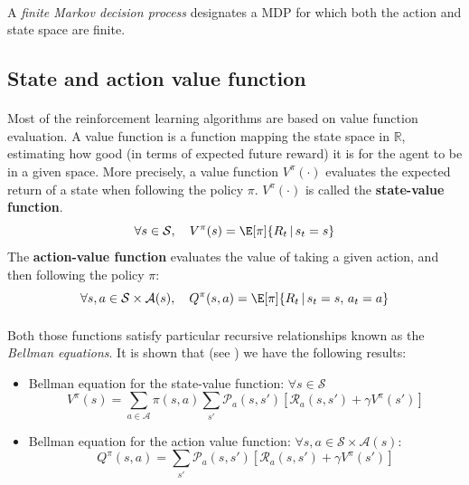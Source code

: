 \documentclass[a4paper]{report}
\begin{document}
{{{				\paragraph{} A \emph{finite Markov decision process} designates a MDP for which both the action and state space are finite. 
			}
			\subsection{State and action value function}
			{
				\paragraph{} Most of the reinforcement learning algorithms are based on value function evaluation. A value function is a function mapping the state space in $\mathbb{R}$, estimating how good (in terms of expected future reward) it is for the agent to be in a given space. More precisely, a value function $V^\pi(\cdot)$ evaluates the expected return of a state when following the policy $\pi$. $V^\pi(\cdot)$ is called the \textbf{state-value function}. 
				\begin{equation}
					\forall{s}\in\mathcal{S}, \quad V^\pi(s) = \E[\pi]{R_t \, \vert \, s_t = s}
				\end{equation}
				The \textbf{action-value function} evaluates the value of taking a given action, and then following the policy $\pi$: 
				\begin{equation}
					\forall{s,a}\in\mathcal{S}\times\mathcal{A}(s), \quad Q^\pi(s,a) = \E[\pi]{ R_t \, \vert \, s_t=s, \, a_t=a}
				\end{equation}
				
				\paragraph{} Both those functions satisfy particular recursive relationships known as the \emph{Bellman equations}. It is shown that (see \cite{Sutton98a}) we have the following results: 
				\vspace{10pt}
				
				{
					\begin{itemize}[label=$\triangleright$]
						\item Bellman equation for the state-value function: $\forall s \in\mathcal{S}$ 
						\begin{equation}
							V^\pi(s) = \sum_{a\in\mathcal{A}}\pi(s,a)\sum_{s'} \mathcal{P}_a(s,s')\left[\mathcal{R}_a(s,s') + \gamma V^\pi(s')\right]
						\end{equation}
						\item Bellman equation for the action value function: $\forall{s,a}\in\mathcal{S}\times\mathcal{A}(s)$: 
						\begin{equation}
							Q^\pi(s,a) = \sum_{s'}\mathcal{P}_a(s,s')\left[ \mathcal{R}_a(s,s') + \gamma V^\pi(s')\right]
						\end{equation}
					\end{itemize}
				}
			}
}}
\end{document}

